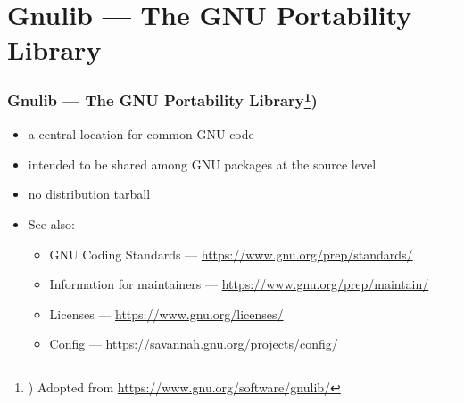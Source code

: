 \documentclass[aspectratio=169, xcolor=table, notheorems, hyperref={pdfpagelabels=false}]{beamer}
\begin{document}
\section{Gnulib --- The GNU Portability Library}
\begin{frame}
\frametitle{Gnulib --- The GNU Portability Library\footnote{%
) Adopted from \url{https://www.gnu.org/software/gnulib/}%
})}

\begin{itemize}
\item a central location for common GNU code
\item intended to be shared among GNU packages at the source level
\item no distribution tarball 
\item See also:
\begin{itemize}
\item GNU Coding Standards --- \url{https://www.gnu.org/prep/standards/}
\item Information for maintainers --- \url{https://www.gnu.org/prep/maintain/}
\item Licenses --- \url{https://www.gnu.org/licenses/}
\item Config --- \url{https://savannah.gnu.org/projects/config/}
\end{itemize}
\end{itemize}

\end{frame}

\end{document}
